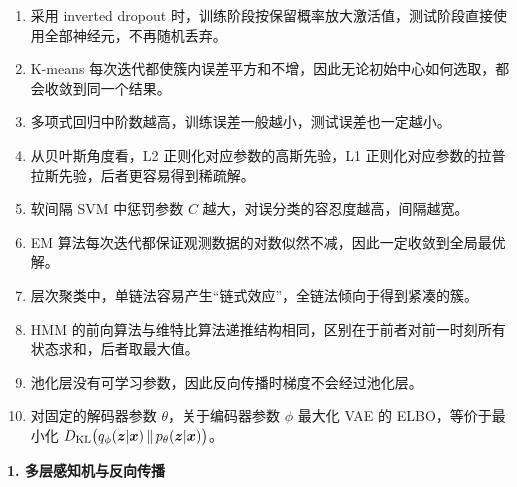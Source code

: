 \begin{enumerate}[label=\arabic*.,start=11]
\item \judge 采用 inverted dropout 时，训练阶段按保留概率放大激活值，测试阶段直接使用全部神经元，不再随机丢弃。
\item \judge K-means 每次迭代都使簇内误差平方和不增，因此无论初始中心如何选取，都会收敛到同一个结果。
\item \judge 多项式回归中阶数越高，训练误差一般越小，测试误差也一定越小。
\item \judge 从贝叶斯角度看，L2 正则化对应参数的高斯先验，L1 正则化对应参数的拉普拉斯先验，后者更容易得到稀疏解。
\item \judge 软间隔 SVM 中惩罚参数 $C$ 越大，对误分类的容忍度越高，间隔越宽。
\item \judge EM 算法每次迭代都保证观测数据的对数似然不减，因此一定收敛到全局最优解。
\item \judge 层次聚类中，单链法容易产生“链式效应”，全链法倾向于得到紧凑的簇。
\item \judge HMM 的前向算法与维特比算法递推结构相同，区别在于前者对前一时刻所有状态求和，后者取最大值。
\item \judge 池化层没有可学习参数，因此反向传播时梯度不会经过池化层。
\item \judge 对固定的解码器参数 $\theta$，关于编码器参数 $\phi$ 最大化 VAE 的 ELBO，等价于最小化 $D_{\mathrm{KL}}\big(q_\phi(\bm z|\bm x)\,\|\,p_\theta(\bm z|\bm x)\big)$。
\end{enumerate}


\noindent\textbf{1. 多层感知机与反向传播}

